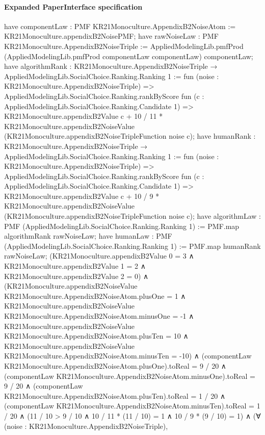 \documentclass[10pt]{article}
\begin{document}
\paragraph{Expanded PaperInterface specification}
\begin{ReviewVerbatim}
have componentLaw : PMF KR21Monoculture.AppendixB2NoiseAtom := KR21Monoculture.appendixB2NoisePMF;
have rawNoiseLaw : PMF KR21Monoculture.AppendixB2NoiseTriple :=
  AppliedModelingLib.pmfProd (AppliedModelingLib.pmfProd componentLaw componentLaw) componentLaw;
have algorithmRank : KR21Monoculture.AppendixB2NoiseTriple → AppliedModelingLib.SocialChoice.Ranking.Ranking 1 :=
  fun (noise : KR21Monoculture.AppendixB2NoiseTriple) =>
  AppliedModelingLib.SocialChoice.Ranking.rankByScore fun (c : AppliedModelingLib.SocialChoice.Ranking.Candidate 1) =>
    KR21Monoculture.appendixB2Value c +
      10 / 11 * KR21Monoculture.appendixB2NoiseValue (KR21Monoculture.appendixB2NoiseTripleFunction noise c);
have humanRank : KR21Monoculture.AppendixB2NoiseTriple → AppliedModelingLib.SocialChoice.Ranking.Ranking 1 :=
  fun (noise : KR21Monoculture.AppendixB2NoiseTriple) =>
  AppliedModelingLib.SocialChoice.Ranking.rankByScore fun (c : AppliedModelingLib.SocialChoice.Ranking.Candidate 1) =>
    KR21Monoculture.appendixB2Value c +
      10 / 9 * KR21Monoculture.appendixB2NoiseValue (KR21Monoculture.appendixB2NoiseTripleFunction noise c);
have algorithmLaw : PMF (AppliedModelingLib.SocialChoice.Ranking.Ranking 1) := PMF.map algorithmRank rawNoiseLaw;
have humanLaw : PMF (AppliedModelingLib.SocialChoice.Ranking.Ranking 1) := PMF.map humanRank rawNoiseLaw;
(KR21Monoculture.appendixB2Value 0 = 3 ∧
    KR21Monoculture.appendixB2Value 1 = 2 ∧ KR21Monoculture.appendixB2Value 2 = 0) ∧
  (KR21Monoculture.appendixB2NoiseValue KR21Monoculture.AppendixB2NoiseAtom.plusOne = 1 ∧
      KR21Monoculture.appendixB2NoiseValue KR21Monoculture.AppendixB2NoiseAtom.minusOne = -1 ∧
        KR21Monoculture.appendixB2NoiseValue KR21Monoculture.AppendixB2NoiseAtom.plusTen = 10 ∧
          KR21Monoculture.appendixB2NoiseValue KR21Monoculture.AppendixB2NoiseAtom.minusTen = -10) ∧
    (componentLaw KR21Monoculture.AppendixB2NoiseAtom.plusOne).toReal = 9 / 20 ∧
      (componentLaw KR21Monoculture.AppendixB2NoiseAtom.minusOne).toReal = 9 / 20 ∧
        (componentLaw KR21Monoculture.AppendixB2NoiseAtom.plusTen).toReal = 1 / 20 ∧
          (componentLaw KR21Monoculture.AppendixB2NoiseAtom.minusTen).toReal = 1 / 20 ∧
            (11 / 10 > 9 / 10 ∧ 10 / 11 * (11 / 10) = 1 ∧ 10 / 9 * (9 / 10) = 1) ∧
              (∀ (noise : KR21Monoculture.AppendixB2NoiseTriple),

\end{ReviewVerbatim}
\end{document}
